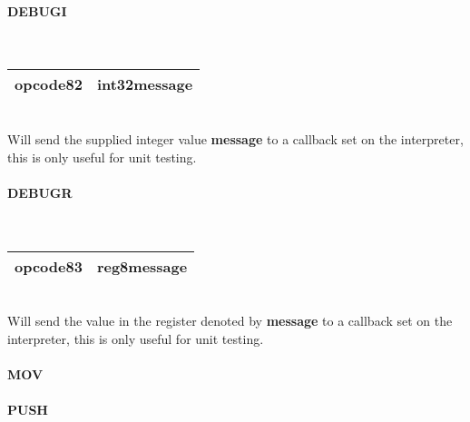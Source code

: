 \documentclass[12pt,a4paper]{article}
\begin{document}
\vspace{2em}\begin{minipage}{\textwidth}
\paragraph{DEBUGI}
~\vspace{1em}\\\begin{tabular}{|p{2cm}|p{8cm}|}
\hline
opcode8\newline\textbf{2} & int32\newline\textbf{message} \\
\hline
\end{tabular}\vspace{1em}\\
Will send the supplied integer value \textbf{message} to a callback set on the interpreter, this is only useful for unit testing.
\end{minipage}

\vspace{2em}\begin{minipage}{\textwidth}
\paragraph{DEBUGR}
~\vspace{1em}\\\begin{tabular}{|p{2cm}|p{8cm}|}
\hline
opcode8\newline\textbf{3} & reg8\newline\textbf{message} \\
\hline
\end{tabular}\vspace{1em}\\
Will send the value in the register denoted by \textbf{message} to a callback
set on the interpreter, this is only useful for unit testing.
\end{minipage}

\vspace{2em}\begin{minipage}{\textwidth}
\paragraph{MOV}
\end{minipage}

\vspace{2em}\begin{minipage}{\textwidth}
\paragraph{PUSH}
\end{minipage}
\end{document}
